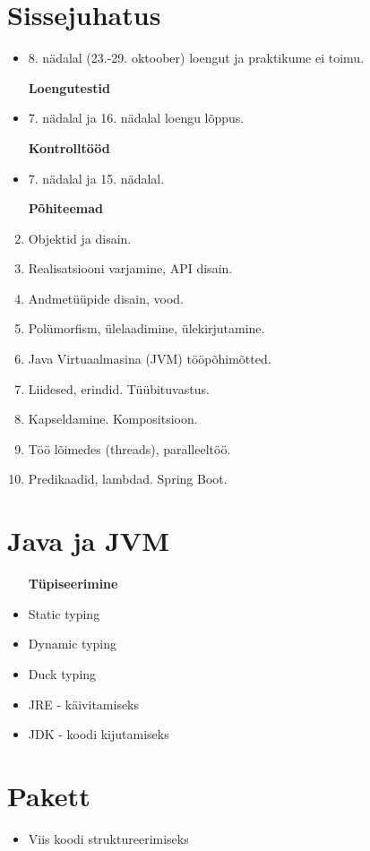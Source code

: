 \documentclass[12pt]{article}
\begin{document}
\begin{titlepage}
\maketitle
\end{titlepage}


\section{Sissejuhatus}

\begin{itemize}
\item 8. nädalal (23.-29. oktoober) loengut ja praktikume ei toimu.
\item [\textbf{Loengutestid}]
\item 7. nädalal ja 16. nädalal loengu lõppus.
\item [\textbf{Kontrolltööd}]
\item 7. nädalal ja 15. nädalal.
\end{itemize}

\begin{enumerate}
\item [\textbf{Põhiteemad}]
\item Objektid ja disain.
\item Realisatsiooni varjamine, API disain.
\item Andmetüüpide disain, vood.
\item Polümorfism, ülelaadimine, ülekirjutamine.
\item Java Virtuaalmasina (JVM) tööpõhimõtted.
\item Liidesed, erindid. Tüübituvastus.
\item Kapseldamine. Kompositsioon.
\item Töö lõimedes (threads), paralleeltöö.
\item Predikaadid, lambdad. Spring Boot.
\end{enumerate}

\section{Java ja JVM}

\begin{itemize}
\item [\textbf{Tüpiseerimine}]
\item Static typing
\item Dynamic typing
\item Duck typing
\item JRE - käivitamiseks
\item JDK - koodi kijutamiseks

\end{itemize}

\section{Pakett}

\begin{itemize}
\item Viis koodi struktureerimiseks
\end{itemize}
\end{document}
